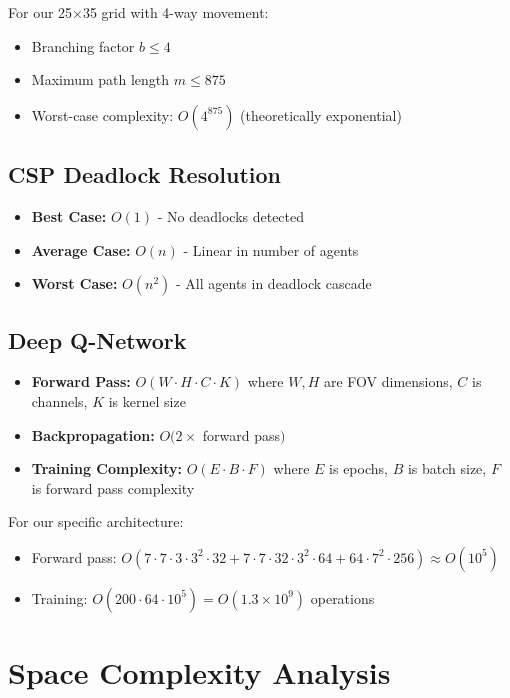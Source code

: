 \documentclass[12pt, a4paper]{report}
\begin{document}
For our 25×35 grid with 4-way movement:
\begin{itemize}
    \item Branching factor $b \leq 4$
    \item Maximum path length $m \leq 875$
    \item Worst-case complexity: $O(4^{875})$ (theoretically exponential)
\end{itemize}

\subsection{CSP Deadlock Resolution}
\begin{itemize}
    \item \textbf{Best Case:} $O(1)$ - No deadlocks detected
    \item \textbf{Average Case:} $O(n)$ - Linear in number of agents
    \item \textbf{Worst Case:} $O(n^2)$ - All agents in deadlock cascade
\end{itemize}

\subsection{Deep Q-Network}
\begin{itemize}
    \item \textbf{Forward Pass:} $O(W \cdot H \cdot C \cdot K)$ where $W,H$ are FOV dimensions, $C$ is channels, $K$ is kernel size
    \item \textbf{Backpropagation:} $O(2 \times$ forward pass$)$
    \item \textbf{Training Complexity:} $O(E \cdot B \cdot F)$ where $E$ is epochs, $B$ is batch size, $F$ is forward pass complexity
\end{itemize}

For our specific architecture:
\begin{itemize}
    \item Forward pass: $O(7 \cdot 7 \cdot 3 \cdot 3^2 \cdot 32 + 7 \cdot 7 \cdot 32 \cdot 3^2 \cdot 64 + 64 \cdot 7^2 \cdot 256) \approx O(10^5)$
    \item Training: $O(200 \cdot 64 \cdot 10^5) = O(1.3 \times 10^9)$ operations
\end{itemize}

\section{Space Complexity Analysis}
\end{document}
